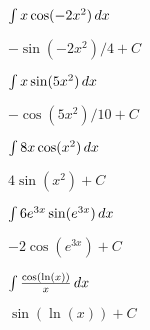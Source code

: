 \begin{exercises}
\begin{multicols}{2}
\begin{exercise}
$\int x \cos(-2x^2) \, d x$
\begin{answer}
$-\sin(-2x^2)/4 +C$
\end{answer}
\end{exercise}

\begin{exercise}
$\int x \sin(5x^2) \, d x$
\begin{answer}
$-\cos(5x^2)/10 +C$
\end{answer}
\end{exercise}

\columnbreak

\begin{exercise}
$\int 8x\cos(x^2)\, d x$       
\begin{answer}
$4\sin(x^2)+C$
\end{answer}
\end{exercise}

\begin{exercise}
$\int 6e^{3x} \sin(e^{3x}) \, d x$   
\begin{answer}
$-2\cos(e^{3x})+C$
\end{answer}
\end{exercise}

\begin{exercise}
$\int \frac{\cos(\ln(x))}{x} \, d x$ 
\begin{answer}
$\sin(\ln(x)) + C$
\end{answer}
\end{exercise}
\end{multicols}
\end{exercises}



